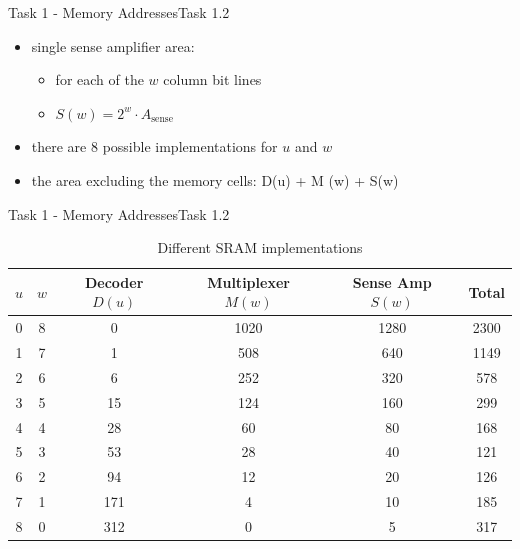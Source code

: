 \begin{frame}[allowframebreaks]{Task 1 - Memory Addresses}{Task 1.2\vspace{0.25cm}}
\begin{itemize}
\begin{itemize}
    \end{itemize}
    \item \alert{single sense amplifier area:}
    \begin{itemize}
      \item for each of the $w$ \alert{column bit lines}
      \item $S(w)=2^w \cdot A_{\text {sense}}$
    \end{itemize}
    \item there are $8$ possible \alert{implementations} for $u$ and $w$
    \item the area \alert{excluding} the memory cells: D(u) + M (w) + S(w)
  \end{itemize}
\end{frame}

\begin{frame}{Task 1 - Memory Addresses}{Task 1.2\vspace{0.25cm}}
  \centering
 \begin{table}
   \begin{tabular}{|c|c||c|c|c|c|}
      \hline$u$ & $w$ & Decoder $D(u)$ & Multiplexer $M(w)$ & Sense Amp $S(w)$ & Total \\
      \hline \hline 0 & 8 & 0 & 1020 & 1280 & 2300 \\
      \hline 1 & 7 & 1 & 508 & 640 & 1149 \\
      \hline 2 & 6 & 6 & 252 & 320 & 578 \\
      \hline 3 & 5 & 15 & 124 & 160 & 299 \\
      \hline 4 & 4 & 28 & 60 & 80 & 168 \\
      \hline 5 & 3 & 53 & 28 & 40 & 121 \\
      \hline 6 & 2 & 94 & 12 & 20 & 126 \\
      \hline 7 & 1 & 171 & 4 & 10 & 185 \\
      \hline 8 & 0 & 312 & 0 & 5 & 317 \\
      \hline
    \end{tabular}
    \caption{Different SRAM implementations}
 \end{table}
\end{frame}
